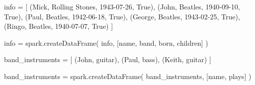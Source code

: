 \documentclass[
  11pt,
  letterpaper,
  DIV=11,
  numbers=noendperiod]{scrreprt}
\newenvironment{Shaded}{\begin{snugshade}}{\end{snugshade}}
\newcommand{\NormalTok}[1]{\textcolor[rgb]{0.00,0.23,0.31}{#1}}
\newcommand{\OperatorTok}[1]{\textcolor[rgb]{0.37,0.37,0.37}{#1}}
\newcommand{\StringTok}[1]{\textcolor[rgb]{0.13,0.47,0.30}{#1}}
\newcommand{\VariableTok}[1]{\textcolor[rgb]{0.07,0.07,0.07}{#1}}
\begin{document}
\begin{Shaded}
\begin{Highlighting}[]
\NormalTok{info }\OperatorTok{=}\NormalTok{ [}
\NormalTok{    (}\StringTok{\textquotesingle{}Mick\textquotesingle{}}\NormalTok{, }\StringTok{\textquotesingle{}Rolling Stones\textquotesingle{}}\NormalTok{, }\StringTok{\textquotesingle{}1943{-}07{-}26\textquotesingle{}}\NormalTok{, }\VariableTok{True}\NormalTok{),}
\NormalTok{    (}\StringTok{\textquotesingle{}John\textquotesingle{}}\NormalTok{, }\StringTok{\textquotesingle{}Beatles\textquotesingle{}}\NormalTok{, }\StringTok{\textquotesingle{}1940{-}09{-}10\textquotesingle{}}\NormalTok{, }\VariableTok{True}\NormalTok{),}
\NormalTok{    (}\StringTok{\textquotesingle{}Paul\textquotesingle{}}\NormalTok{, }\StringTok{\textquotesingle{}Beatles\textquotesingle{}}\NormalTok{, }\StringTok{\textquotesingle{}1942{-}06{-}18\textquotesingle{}}\NormalTok{, }\VariableTok{True}\NormalTok{),}
\NormalTok{    (}\StringTok{\textquotesingle{}George\textquotesingle{}}\NormalTok{, }\StringTok{\textquotesingle{}Beatles\textquotesingle{}}\NormalTok{, }\StringTok{\textquotesingle{}1943{-}02{-}25\textquotesingle{}}\NormalTok{, }\VariableTok{True}\NormalTok{),}
\NormalTok{    (}\StringTok{\textquotesingle{}Ringo\textquotesingle{}}\NormalTok{, }\StringTok{\textquotesingle{}Beatles\textquotesingle{}}\NormalTok{, }\StringTok{\textquotesingle{}1940{-}07{-}07\textquotesingle{}}\NormalTok{, }\VariableTok{True}\NormalTok{)}
\NormalTok{]}

\NormalTok{info }\OperatorTok{=}\NormalTok{ spark.createDataFrame(}
\NormalTok{    info,}
\NormalTok{    [}\StringTok{\textquotesingle{}name\textquotesingle{}}\NormalTok{, }\StringTok{\textquotesingle{}band\textquotesingle{}}\NormalTok{, }\StringTok{\textquotesingle{}born\textquotesingle{}}\NormalTok{, }\StringTok{\textquotesingle{}children\textquotesingle{}}\NormalTok{]}
\NormalTok{)}

\NormalTok{band\_instruments }\OperatorTok{=}\NormalTok{ [}
\NormalTok{    (}\StringTok{\textquotesingle{}John\textquotesingle{}}\NormalTok{, }\StringTok{\textquotesingle{}guitar\textquotesingle{}}\NormalTok{),}
\NormalTok{    (}\StringTok{\textquotesingle{}Paul\textquotesingle{}}\NormalTok{, }\StringTok{\textquotesingle{}bass\textquotesingle{}}\NormalTok{),}
\NormalTok{    (}\StringTok{\textquotesingle{}Keith\textquotesingle{}}\NormalTok{, }\StringTok{\textquotesingle{}guitar\textquotesingle{}}\NormalTok{)}
\NormalTok{]}

\NormalTok{band\_instruments }\OperatorTok{=}\NormalTok{ spark.createDataFrame(}
\NormalTok{    band\_instruments,}
\NormalTok{    [}\StringTok{\textquotesingle{}name\textquotesingle{}}\NormalTok{, }\StringTok{\textquotesingle{}plays\textquotesingle{}}\NormalTok{]}
\NormalTok{)}
\end{Highlighting}
\end{Shaded}
\end{document}
